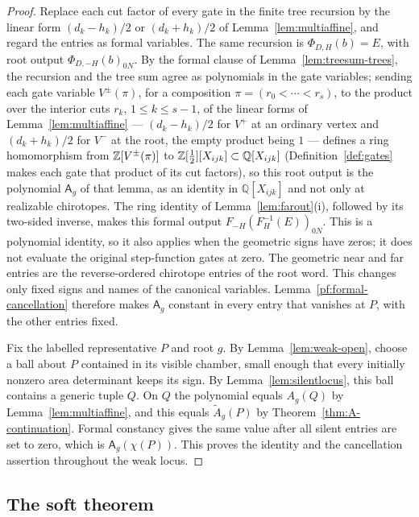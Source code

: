 \begin{proof}
Replace each cut factor of every gate in the finite tree recursion by
the linear form $(d_k-h_k)/2$ or $(d_k+h_k)/2$ of
Lemma~\ref{lem:multiaffine}, and regard the entries as formal
variables. The same recursion is
$\Phi_{D,H}(b)=E$, with root output $\Phi_{D,-H}(b)_{0N}$.
By the formal clause of Lemma~\ref{lem:treesum-trees}, the recursion and the
tree sum agree as polynomials in the gate variables; sending each gate
variable $V^\pm(\pi)$, for a composition $\pi=(r_0<\cdots<r_s)$, to the
product over the interior cuts $r_k$, $1\leq k\leq s-1$, of the linear forms
of Lemma~\ref{lem:multiaffine} --- $(d_k-h_k)/2$ for $V^+$ at an ordinary
vertex and $(d_k+h_k)/2$ for $V^-$ at the root, the empty product being $1$
--- defines a ring homomorphism from $\mathbb Z[V^\pm(\pi)]$ to
$\mathbb Z[\tfrac12][X_{ijk}]\subset\mathbb Q[X_{ijk}]$ (Definition~\ref{def:gates}
makes each gate that product of its cut factors), so this root output is the
polynomial $\mathsf A_g$ of that lemma, as an identity in
$\mathbb Q[X_{ijk}]$ and not only at realizable chirotopes.
The ring identity of Lemma~\ref{lem:farout}(i), followed by its
two-sided inverse, makes this formal output
$F_{-H}(F_H^{-1}(E))_{0N}$. This is a polynomial identity, so it
also applies when the geometric signs have zeros; it does not
evaluate the original step-function gates at zero.
The geometric near and far entries are the reverse-ordered
chirotope entries of the root word. This changes only fixed signs
and names of the canonical variables. Lemma~\ref{pf:formal-cancellation}
therefore makes $\mathsf A_g$ constant in every entry that vanishes
at $P$, with the other entries fixed.

Fix the labelled representative $P$ and root $g$. By
Lemma~\ref{lem:weak-open}, choose a ball about $P$ contained in its
visible chamber, small enough that every initially nonzero
area determinant keeps its sign. By Lemma~\ref{lem:silentlocus},
this ball contains a generic tuple $Q$. On $Q$ the polynomial equals $A_g(Q)$
by Lemma~\ref{lem:multiaffine}, and this equals
$\widetilde A_g(P)$ by Theorem~\ref{thm:A-continuation}.
Formal constancy gives the same value after all silent entries are
set to zero, which is $\mathsf A_g(\chi(P))$. This proves the
identity and the cancellation assertion throughout the weak locus.
\end{proof}


\subsection{The soft theorem}

